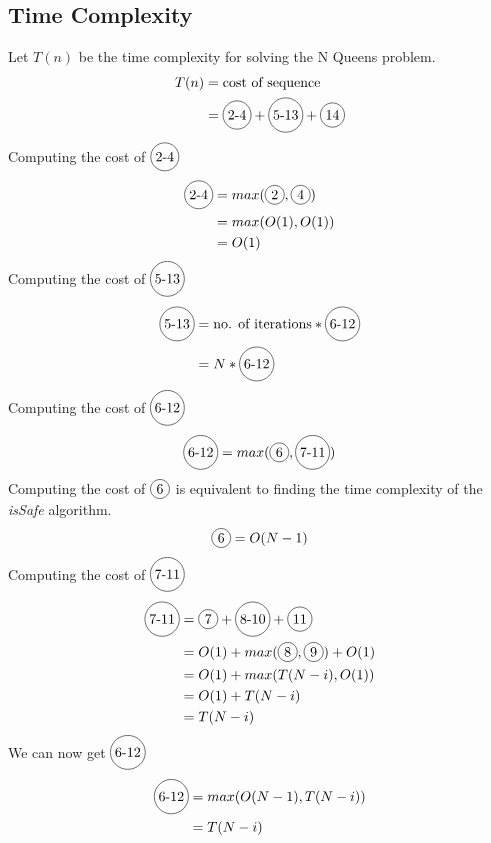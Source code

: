 \documentclass[12pt]{article}%
\newcommand*\circled[1]{\tikz[baseline=(char.base)]{
            \node[shape=circle,draw,inner sep=2pt] (char) {#1};}}
\begin{document}
  \subsection{Time Complexity}
      Let $T(n)$ be the time complexity for solving the N Queens problem.
      \begin{align*}
        T(n) &= \text{cost of sequence} \\
        &= \circled{2-4} + \circled{5-13} + \circled{14} \\ 
      \end{align*}
      Computing the cost of $\circled{2-4}$
      \begin{align*}
        \circled{2-4} &= max(\circled{2}, \circled{4}) \\
        &= max(O(1),O(1)) \\
        &= O(1)
      \end{align*}
      Computing the cost of $\circled{5-13}$
      \begin{align*}
        \circled{5-13} &= \text{no. of iterations} * \circled{6-12} \\
         &= N * \circled{6-12}
      \end{align*}
      Computing the cost of $\circled{6-12}$
      \begin{align*}
        \circled{6-12} = max(\circled{6}, \circled{7-11})
      \end{align*}
      Computing the cost of $\circled{6}$ is equivalent to finding the time complexity of the \textit{isSafe} algorithm.
      \begin{align*}
        \circled{6} = O(N - 1) 
      \end{align*}
      Computing the cost of $\circled{7-11}$
      \begin{align*}
        \circled{7-11} &= \circled{7} + \circled{8-10} + \circled{11} \\
        &= O(1) + max(\circled{8}, \circled{9}) + O(1) \\
        &= O(1) + max(T(N - i), O(1)) \\
        &= O(1) + T(N - i) \\
        &= T(N - i)
      \end{align*}
      We can now get $\circled{6-12}$
      \begin{align*}
        \circled{6-12} &= max(O(N - 1), T(N - i)) \\
        &= T(N - i)
      \end{align*}
\end{document}
